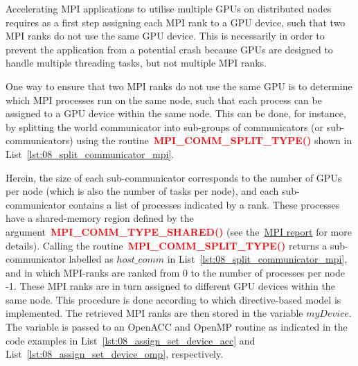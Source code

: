\par
Accelerating MPI applications to utilise multiple GPUs on distributed nodes requires as a first step assigning each MPI rank to a GPU device, such that two MPI ranks do not use the same GPU device.
This is necessarily in order to prevent the application from a potential crash because GPUs are designed to handle multiple threading tasks, but not multiple MPI ranks.


\par
One way to ensure that two MPI ranks do not use the same GPU is to determine which MPI processes run on the same node, such that each process can be assigned to a GPU device within the same node.
This can be done, for instance, by splitting the world communicator into sub-groups of communicators (or sub-communicators) using the routine~\textbf{\textcolor{red}{MPI\_COMM\_SPLIT\_TYPE()}} shown in List~\ref{lst:08_split_communicator_mpi}. 





\par
Herein, the size of each sub-communicator corresponds to the number of GPUs per node (which is also the number of tasks per node), and each sub-communicator contains a list of processes indicated by a rank.
These processes have a shared-memory region defined by the argument~\textbf{\textcolor{red}{MPI\_COMM\_TYPE\_SHARED()}} (see the~\href{https://www.mpi-forum.org/docs/mpi-4.0/mpi40-report.pdf}{MPI report} for more details).
Calling the routine~\textbf{\textcolor{red}{MPI\_COMM\_SPLIT\_TYPE()}} returns a sub-communicator labelled as $host\_comm$ in List~\ref{lst:08_split_communicator_mpi}, and in which MPI-ranks are ranked from 0 to the number of processes per node -1.
These MPI ranks are in turn assigned to different GPU devices within the same node.
This procedure is done according to which directive-based model is implemented.
The retrieved MPI ranks are then stored in the variable $myDevice$.
The variable is passed to an OpenACC and OpenMP routine as indicated in the code examples in List~\ref{lst:08_assign_set_device_acc} and List~\ref{lst:08_assign_set_device_omp}, respectively.





